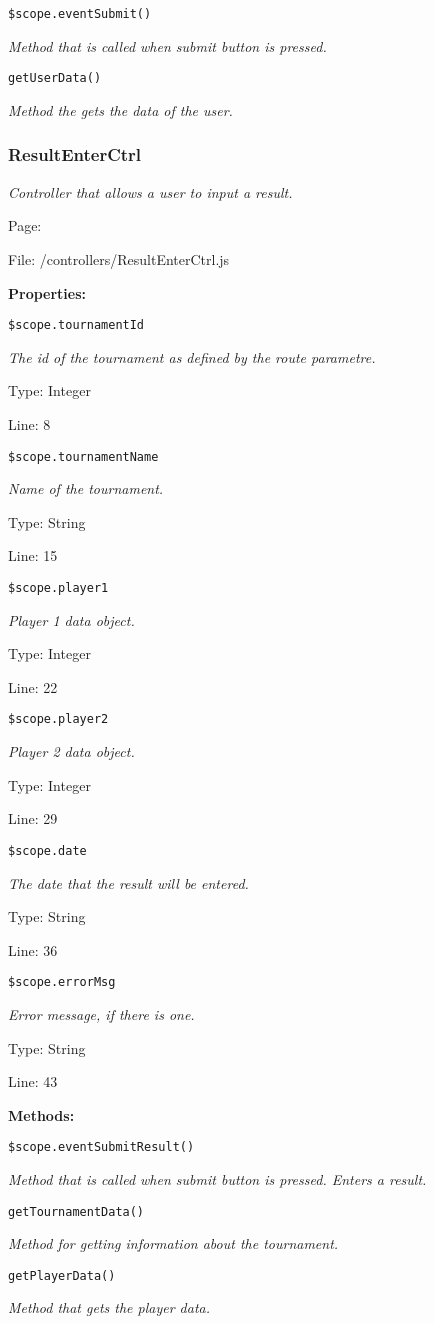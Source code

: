 \texttt{\$scope.eventSubmit()}

{\scriptsize
\textit{Method that is called when submit button is pressed.}

}

\texttt{getUserData()}

{\scriptsize
\textit{Method the gets the data of the user.}

}

\subsubsection{ResultEnterCtrl}\label{ResultEnterCtrl.js.doc}
\textit{Controller that allows a user to input a result.}

Page: \pageref{ResultEnterCtrl.js}

File: /controllers/ResultEnterCtrl.js

\textbf{Properties:}

\texttt{\$scope.tournamentId}

{\scriptsize
\textit{The id of the tournament as defined by the route parametre.}

Type: Integer

Line: 8

}
\texttt{\$scope.tournamentName}

{\scriptsize
\textit{Name of the tournament.}

Type: String

Line: 15

}
\texttt{\$scope.player1}

{\scriptsize
\textit{Player 1 data object.}

Type: Integer

Line: 22

}
\texttt{\$scope.player2}

{\scriptsize
\textit{Player 2 data object.}

Type: Integer

Line: 29

}
\texttt{\$scope.date}

{\scriptsize
\textit{The date that the result will be entered.}

Type: String

Line: 36

}
\texttt{\$scope.errorMsg}

{\scriptsize
\textit{Error message, if there is one.}

Type: String

Line: 43

}
\textbf{Methods:}

\texttt{\$scope.eventSubmitResult()}

{\scriptsize
\textit{Method that is called when submit button is pressed.
Enters a result.}

}

\texttt{getTournamentData()}

{\scriptsize
\textit{Method for getting information about the tournament.}

}

\texttt{getPlayerData()}

{\scriptsize
\textit{Method that gets the player data.}

}

